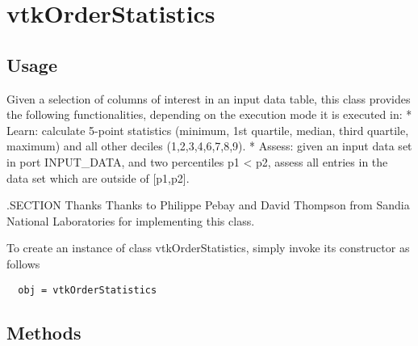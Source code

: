 \section{vtkOrderStatistics}

\subsection{Usage}

 Given a selection of columns of interest in an input data table, this 
 class provides the following functionalities, depending on the
 execution mode it is executed in:
 * Learn: calculate 5-point statistics (minimum, 1st quartile, median, third
   quartile, maximum) and all other deciles (1,2,3,4,6,7,8,9).
 * Assess: given an input data set in port INPUT\_DATA, and two percentiles p1 < p2,
   assess all entries in the data set which are outside of [p1,p2].

 .SECTION Thanks
 Thanks to Philippe Pebay and David Thompson from Sandia National Laboratories 
 for implementing this class.

To create an instance of class vtkOrderStatistics, simply
invoke its constructor as follows
\begin{verbatim}
  obj = vtkOrderStatistics
\end{verbatim}
\subsection{Methods}


